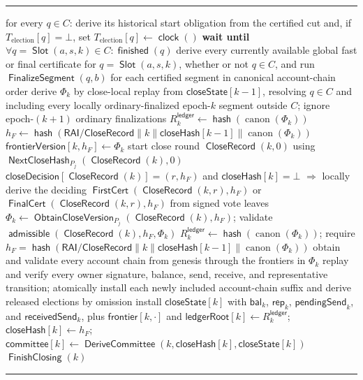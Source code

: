 \documentclass[sigplan,twocolumn,review,anonymous]{acmart}
\newenvironment{breakablealgorithm}
{%
  \par\addvspace{\baselineskip}%
  \begingroup\footnotesize
  \setlength{\baselineskip}{10pt}%
  \refstepcounter{algorithm}%
  \noindent\hrule\kern2pt%
  \renewcommand{\caption}[1]{%
    \noindent\textbf{Algorithm~\thealgorithm} ##1\par\kern2pt\hrule\kern2pt%
  }%
}
{%
  \kern2pt\hrule\par\endgroup\addvspace{\baselineskip}%
}
\newcommand{\func}[1]{\operatorname{\mathsf{#1}}}
\newcommand{\hash}{\func{hash}}
\newcommand{\FirstCert}{\func{FirstCert}}
\newcommand{\FinalCert}{\func{FinalCert}}
\newcommand{\Slot}{\func{Slot}}
\newcommand{\CloseRecord}{\func{CloseRecord}}
\newcommand{\closeDecision}{\mathsf{closeDecision}}
\newcommand{\finished}{\func{finished}}
\newcommand{\admissible}{\func{admissible}}
\newcommand{\FinishClosing}{\func{FinishClosing}}
\newcommand{\frontier}{\mathsf{frontier}}
\newcommand{\ledgerRoot}{\mathsf{ledgerRoot}}
\newcommand{\closeHash}{\mathsf{closeHash}}
\newcommand{\FinalizeSegment}{\func{FinalizeSegment}}
\newcommand{\committee}{\mathsf{committee}}
\newcommand{\deriveCommittee}{\func{DeriveCommittee}}
\newcommand{\closeState}{\mathsf{closeState}}
\newcommand{\frontierVersion}{\mathsf{frontierVersion}}
\newcommand{\bal}{\mathsf{bal}}
\newcommand{\repOf}{\mathsf{rep}}
\newcommand{\pendingSend}{\mathsf{pendingSend}}
\newcommand{\receivedSend}{\mathsf{receivedSend}}
\begin{document}
\begin{breakablealgorithm}
\begin{algorithmic}[1]
\State \quad for every $q\in C$: derive its historical start obligation from the certified cut and, if $T_{\mathrm{election}}[q]=\bot$, set $T_{\mathrm{election}}[q]\gets\func{clock}()$
\State \quad \textbf{wait until} $\forall q=\Slot(a,s,k)\in C:\finished(q)$
\State \quad derive every currently available global fast or final certificate for $q=\Slot(a,s,k)$, whether or not $q\in C$, and run $\FinalizeSegment(q,b)$ for each certified segment in canonical account-chain order
\State \quad derive $\Phi_k$ by close-local replay from $\closeState[k-1]$, resolving $q\in C$ and including every locally ordinary-finalized epoch-$k$ segment outside $C$; ignore epoch-$(k+1)$ ordinary finalizations
\State \quad $R^{\mathsf{ledger}}_k\gets\hash(\operatorname{canon}(\Phi_k))$
\State \quad $h_F\gets\hash(\mathsf{RAI/CloseRecord}\parallel k\parallel\closeHash[k-1]\parallel\operatorname{canon}(\Phi_k))$
\State \quad $\frontierVersion[k,h_F]\gets\Phi_k$
\State \quad start close round $\CloseRecord(k,0)$ using $\func{NextCloseHash}_{P_j}(\CloseRecord(k),0)$
\Statex
\State $\closeDecision[\CloseRecord(k)]=(r,h_F)$ and $\closeHash[k]=\bot$ $\Rightarrow$
\State \quad locally derive the deciding $\FirstCert(\CloseRecord(k,r),h_F)$ or $\FinalCert(\CloseRecord(k,r),h_F)$ from signed vote leaves
\State \quad $\Phi_k\gets\func{ObtainCloseVersion}_{P_j}(\CloseRecord(k),h_F)$; validate $\admissible(\CloseRecord(k),h_F,\Phi_k)$
\State \quad $R^{\mathsf{ledger}}_k\gets\hash(\operatorname{canon}(\Phi_k))$; require $h_F=\hash(\mathsf{RAI/CloseRecord}\parallel k\parallel\closeHash[k-1]\parallel\operatorname{canon}(\Phi_k))$
\State \quad obtain and validate every account chain from genesis through the frontiers in $\Phi_k$
\State \quad replay and verify every owner signature, balance, send, receive, and representative transition; atomically install each newly included account-chain suffix and derive released elections by omission
\State \quad install $\closeState[k]$ with $\bal_k$, $\repOf_k$, $\pendingSend_k$, and $\receivedSend_k$, plus $\frontier[k,\cdot]$ and $\ledgerRoot[k]\gets R^{\mathsf{ledger}}_k$; $\closeHash[k]\gets h_F$; $\committee[k]\gets\deriveCommittee(k,\closeHash[k],\closeState[k])$
\State \quad $\FinishClosing(k)$
\end{algorithmic}
\end{breakablealgorithm}
\end{document}
